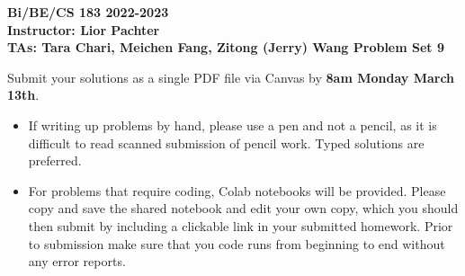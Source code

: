 \documentclass[11pt]{exam}
\begin{document}
\begin{center}

     \textbf{Bi/BE/CS 183 2022-2023\\ Instructor: Lior Pachter\\ TAs: Tara Chari, Meichen Fang, Zitong (Jerry) Wang \vskip 0.15in Problem Set 9}

\end{center}




Submit your solutions as a single PDF file via Canvas by {\bf 8am Monday March 13th}. 
\begin{itemize}
  \item If writing up problems by hand, please use a pen and not a pencil, as it is difficult to read scanned submission of pencil work. Typed solutions are preferred.
  \item For problems that require coding, Colab notebooks will be provided. Please copy and save the shared notebook and edit your own copy, which you should then submit by including a clickable link in your submitted homework. Prior to submission make sure that you code runs from beginning to end without any error reports.


\end{itemize}
\end{document}
